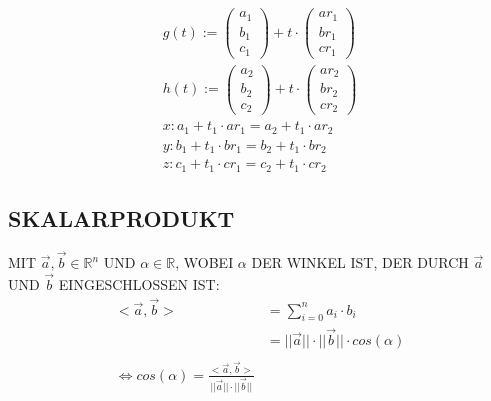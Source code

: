 \documentclass[conference,compsocl]{IEEEtran}
\begin{document}
\begin{equation}
  \label{eq:geraden}
  \begin{split}
    g(t) :=
    \begin{pmatrix}
      a_1 \\ b_1 \\ c_1
    \end{pmatrix}
    +
    t \cdot
    \begin{pmatrix}
      ar_1 \\ br_1 \\ cr_1
    \end{pmatrix}
    \\
    h(t) :=
    \begin{pmatrix}
      a_2 \\ b_2 \\ c_2
    \end{pmatrix}
    +
    t \cdot
    \begin{pmatrix}
      ar_2 \\ br_2 \\ cr_2
    \end{pmatrix}
    \\
    x: a_1 + t_1 \cdot ar_1 = a_2 + t_1 \cdot ar_2\\
    y: b_1 + t_1 \cdot br_1 = b_2 + t_1 \cdot br_2\\
    z: c_1 + t_1 \cdot cr_1 = c_2 + t_1 \cdot cr_2
  \end{split}
\end{equation}

\subsection{SKALARPRODUKT}
MIT $ \vec{a}, \vec{b} \in \mathbb{R}^n $ UND
$ \alpha \in \mathbb{R} $, WOBEI $ \alpha $ DER WINKEL IST, DER DURCH
$ \vec{a} $ UND $ \vec{b} $ EINGESCHLOSSEN IST:
\begin{equation}
  \label{eq:skalarprodukt}
  \begin{split}
    <\vec{a},\vec{b}> & = \sum_{i = 0}^n a_i \cdot b_i \\
    & = ||\vec{a}|| \cdot ||\vec{b}|| \cdot cos(\alpha) \\
    \\
    \Leftrightarrow cos(\alpha) = \frac{<\vec{a},\vec{b}>}{||\vec{a}|| \cdot ||\vec{b}||}
  \end{split}
\end{equation}

\smallskip %


\end{document}
